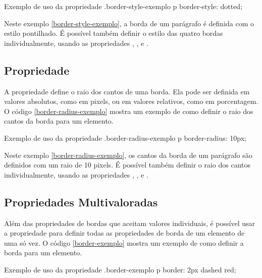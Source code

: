 \begin{csscode}{Exemplo de uso da propriedade .}{border-style-exemplo}
p {
    border-style: dotted;
}
\end{csscode}

Neste exemplo \ref{border-style-exemplo}, a borda de um parágrafo é definida com o estilo pontilhado. É possível também definir o estilo das quatro bordas individualmente, usando as propriedades , ,  e .

\subsection{Propriedade }

A propriedade  define o raio dos cantos de uma borda. Ela pode ser definida em valores absolutos, como em pixels, ou em valores relativos, como em porcentagem. O código \ref{border-radius-exemplo} mostra um exemplo de como definir o raio dos cantos da borda para um elemento.

\begin{csscode}{Exemplo de uso da propriedade .}{border-radius-exemplo}
p {
    border-radius: 10px;
}
\end{csscode}

Neste exemplo \ref{border-radius-exemplo}, os cantos da borda de um parágrafo são definidos com um raio de 10 pixels. É possível também definir o raio dos cantos individualmente, usando as propriedades , ,  e .

\subsection{Propriedades Multivaloradas}

Além das propriedades de bordas que aceitam valores individuais, é possível usar a propriedade  para definir todas as propriedades de borda de um elemento de uma só vez. O código \ref{border-exemplo} mostra um exemplo de como definir a borda para um elemento.

\begin{csscode}{Exemplo de uso da propriedade .}{border-exemplo}
p {
    border: 2px dashed red;
}
\end{csscode}

